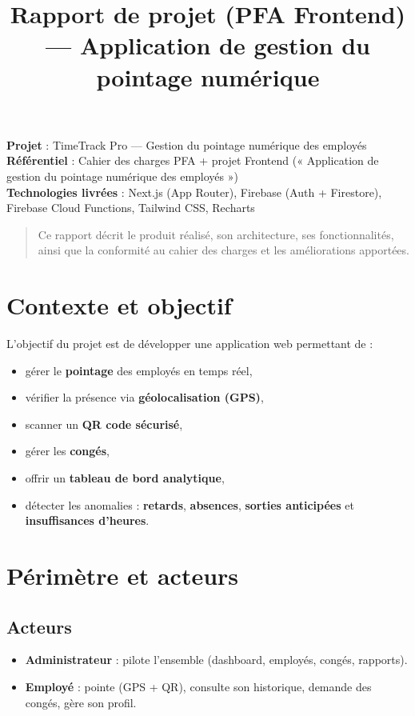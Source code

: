 \documentclass[12pt,a4paper]{article}
\title{Rapport de projet (PFA Frontend) --- Application de gestion du pointage numérique}
\author{}
\date{}
\begin{document}
\maketitle
\tableofcontents
\newpage

\textbf{Projet} : TimeTrack Pro --- Gestion du pointage numérique des employés\\
\textbf{Référentiel} : Cahier des charges PFA + projet Frontend (« Application de gestion du pointage numérique des employés »)\\
\textbf{Technologies livrées} : Next.js (App Router), Firebase (Auth + Firestore), Firebase Cloud Functions, Tailwind CSS, Recharts

\begin{quote}
Ce rapport décrit le produit réalisé, son architecture, ses fonctionnalités, ainsi que la conformité au cahier des charges et les améliorations apportées.
\end{quote}

\section{Contexte et objectif}
L’objectif du projet est de développer une application web permettant de :
\begin{itemize}[leftmargin=*]
  \item gérer le \textbf{pointage} des employés en temps réel,
  \item vérifier la présence via \textbf{géolocalisation (GPS)},
  \item scanner un \textbf{QR code sécurisé},
  \item gérer les \textbf{congés},
  \item offrir un \textbf{tableau de bord analytique},
  \item détecter les anomalies : \textbf{retards}, \textbf{absences}, \textbf{sorties anticipées} et \textbf{insuffisances d’heures}.
\end{itemize}

\section{Périmètre et acteurs}
\subsection{Acteurs}
\begin{itemize}[leftmargin=*]
  \item \textbf{Administrateur} : pilote l’ensemble (dashboard, employés, congés, rapports).
  \item \textbf{Employé} : pointe (GPS + QR), consulte son historique, demande des congés, gère son profil.
\end{itemize}
\end{document}
